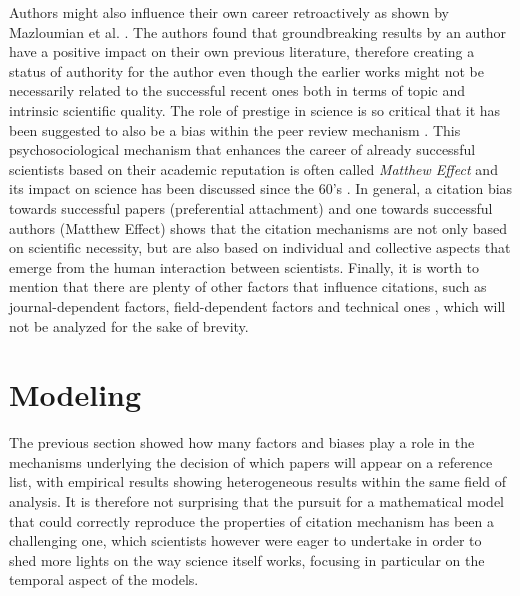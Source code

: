 Authors might also influence their own career retroactively as shown by Mazloumian et al. \cite{10.1371/journal.pone.0018975}. The authors
found that groundbreaking results by an author have a positive impact on their own previous literature, therefore creating a status of authority for the author even though the earlier works
might not be necessarily related to the successful recent ones both in terms of topic and intrinsic scientific quality. The role of prestige in science is so critical that it has been
suggested to also be a bias within the peer review mechanism \cite{ASI:ASI22784}. This psychosociological mechanism that enhances the career of already successful scientists
based on their academic reputation is often called \textit{Matthew Effect} and its impact on science has been discussed since the 60's \cite{MatthewEffect}. In general, a citation bias towards successful papers (preferential
attachment) and one towards successful authors (Matthew Effect) shows that the citation mechanisms are not only based on scientific necessity, but are also based on individual and collective aspects that emerge from the
human interaction between scientists. Finally, it is worth to mention that there are plenty of other factors that influence citations, such as journal-dependent factors, field-dependent factors
and technical ones \cite{doi:10.1108/00220410810844150}, which will not be analyzed for the sake of brevity.






\section{Modeling}

The previous section showed how many factors and biases play a role in the mechanisms underlying the decision of which papers will appear on a reference list, with empirical results showing heterogeneous results within
the same field of analysis. It is therefore not surprising that the pursuit for a mathematical model that could correctly reproduce the properties of citation mechanism has been a challenging one, which scientists however
were eager to undertake in order to shed more lights on the way science itself works, focusing in particular on the temporal aspect of the models.

